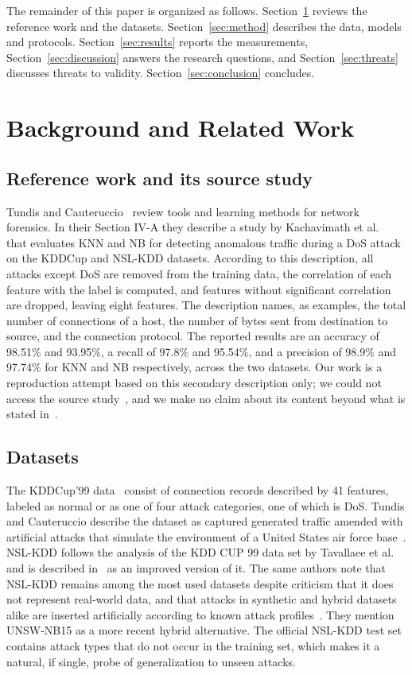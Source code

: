 \documentclass[conference]{IEEEtran}
\begin{document}
The remainder of this paper is organized as follows. Section~\ref{sec:related} reviews the reference work and the datasets. Section~\ref{sec:method} describes the data, models and protocols. Section~\ref{sec:results} reports the measurements, Section~\ref{sec:discussion} answers the research questions, and Section~\ref{sec:threats} discusses threats to validity. Section~\ref{sec:conclusion} concludes.

\section{Background and Related Work}\label{sec:related}
\subsection{Reference work and its source study}
Tundis and Cauteruccio~\cite{tundis2025} review tools and learning methods for network forensics. In their Section IV-A they describe a study by Kachavimath et al.~\cite{kachavimath2020} that evaluates KNN and NB for detecting anomalous traffic during a DoS attack on the KDDCup and NSL-KDD datasets. According to this description, all attacks except DoS are removed from the training data, the correlation of each feature with the label is computed, and features without significant correlation are dropped, leaving eight features. The description names, as examples, the total number of connections of a host, the number of bytes sent from destination to source, and the connection protocol. The reported results are an accuracy of 98.51\% and 93.95\%, a recall of 97.8\% and 95.54\%, and a precision of 98.9\% and 97.74\% for KNN and NB respectively, across the two datasets. Our work is a reproduction attempt based on this secondary description only; we could not access the source study~\cite{kachavimath2020}, and we make no claim about its content beyond what is stated in~\cite{tundis2025}.

\subsection{Datasets}
The KDDCup'99 data~\cite{kddcup99} consist of connection records described by 41 features, labeled as normal or as one of four attack categories, one of which is DoS. Tundis and Cauteruccio describe the dataset as captured generated traffic amended with artificial attacks that simulate the environment of a United States air force base~\cite{tundis2025}. NSL-KDD follows the analysis of the KDD CUP 99 data set by Tavallaee et al.~\cite{tavallaee2009} and is described in~\cite{tundis2025} as an improved version of it. The same authors note that NSL-KDD remains among the most used datasets despite criticism that it does not represent real-world data, and that attacks in synthetic and hybrid datasets alike are inserted artificially according to known attack profiles~\cite{tundis2025}. They mention UNSW-NB15 as a more recent hybrid alternative. The official NSL-KDD test set contains attack types that do not occur in the training set, which makes it a natural, if single, probe of generalization to unseen attacks.
\end{document}
